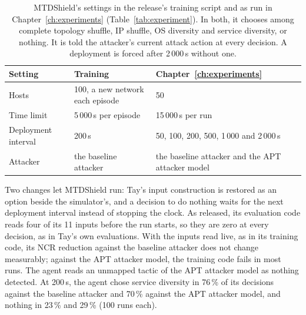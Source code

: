 \documentclass{cshonours}
\newcommand{\tablestyle}{\footnotesize\renewcommand{\arraystretch}{1.0}\rowcolors{2}{}{black!5}}
\begin{document}
\begin{table}[htbp]
  \centering
  \caption[MTDShield's settings in training and in
  Chapter~\ref{ch:experiments}]{MTDShield's settings in
  the release's training script \citep{tay2024code} and as run
  in Chapter~\ref{ch:experiments} (Table~\ref{tab:experiment}). In both, it
  chooses among complete topology shuffle, IP shuffle, OS diversity and service
  diversity, or nothing. It is told the attacker's current attack action at
  every decision. A deployment is forced after 2\,000\,s without one.}
  \label{tab:mtdshield-configuration}
  \tablestyle
  \begin{tabular}{@{}lP{5.4cm}P{6.2cm}@{}}
    \toprule
    Setting & Training & Chapter~\ref{ch:experiments} \\
    \midrule
    Hosts & 100, a new network each episode & 50 \\
    Time limit & 5\,000\,s per episode & 15\,000\,s per run \\
    Deployment interval & 200\,s & 50, 100, 200, 500, 1\,000 and 2\,000\,s \\
    Attacker & the baseline attacker & the baseline attacker and the APT attacker model \\
    \bottomrule
  \end{tabular}
\end{table}

Two changes let MTDShield run: Tay's input construction is restored as an
option beside the simulator's, and a decision to do nothing waits for the next
deployment interval instead of stopping the clock.
As released, its evaluation code reads four of its 11 inputs before the run
starts, so they are zero at every decision, as in Tay's own evaluations. With
the inputs read live, as in its training code, its NCR reduction against the
baseline attacker does not change measurably; against the APT attacker model,
the training code fails in most runs.
 The agent reads an unmapped
tactic of the APT attacker model as nothing detected. At 200\,s, the agent
chose service diversity in 76\,\% of its decisions against the baseline
attacker and 70\,\% against the APT attacker model, and nothing in 23\,\% and
29\,\% (100 runs each).

\FloatBarrier

\end{document}
